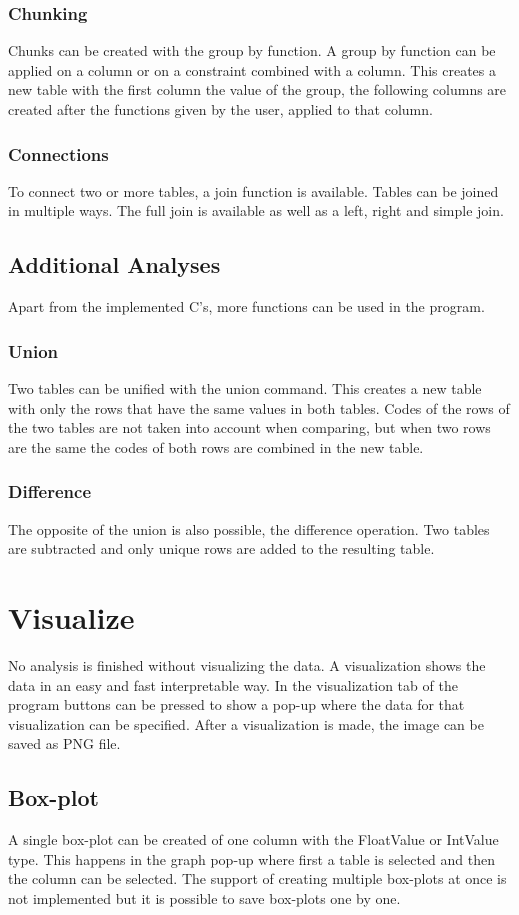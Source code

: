 \subsubsection{Chunking}
Chunks can be created with the group by function. A group by function can be applied on a column or on a constraint combined with a column. This creates a new table with the first column the value of the group, the following columns are created after the functions given by the user, applied to that column.
\subsubsection{Connections}
To connect two or more tables, a join function is available. Tables can be joined in multiple ways. The full join is available as well as a left, right and simple join.
\subsection{Additional Analyses}
Apart from the implemented C's, more functions can be used in the program.  
\subsubsection{Union}
Two tables can be unified with the union command. This creates a new table with only the rows that have the same values in both tables. Codes of the rows of the two tables are not taken into account when comparing, but when two rows are the same the codes of both rows are combined in the new table.
\subsubsection{Difference}
The opposite of the union is also possible, the difference operation. Two tables are subtracted and only unique rows are added to the resulting table.
\section{Visualize}
No analysis is finished without visualizing the data. A visualization shows the data in an easy and fast interpretable way. In the visualization tab of the program buttons can be pressed to show a pop-up where the data for that visualization can be specified. After a visualization is made, the image can be saved as PNG file.
\subsection{Box-plot}
A single box-plot can be created of one column with the FloatValue or IntValue type. This happens in the graph pop-up where first a table is selected and then the column can be selected. The support of creating multiple box-plots at once is not implemented but it is possible to save box-plots one by one.
